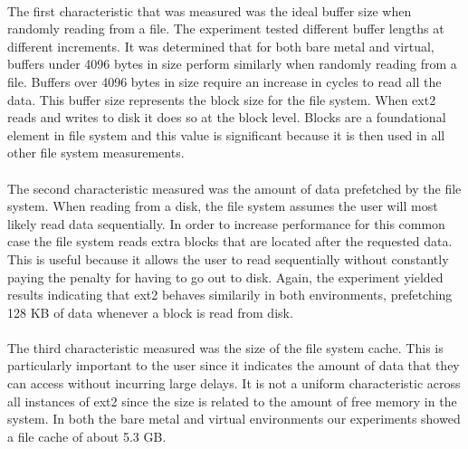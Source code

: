 \documentclass[letterpaper,twocolumn,10pt]{article}
\begin{document}
\paragraph {}
The first characteristic that was measured was the ideal buffer size when randomly reading from a file. 
The experiment tested different buffer lengths at different increments. 
It was determined that for both bare metal and virtual, buffers under 4096 bytes in size perform similarly when randomly reading from a file. 
Buffers over 4096 bytes in size require an increase in cycles to read all the data. 
This buffer size represents the block size for the file system. 
When ext2 reads and writes to disk it does so at the block level.
Blocks are a foundational element in file system and this value is significant because it is then used in all other file system measurements.

\paragraph{}
The second characteristic measured was the amount of data prefetched by the file system. 
When reading from a disk, the file system assumes the user will most likely read data sequentially. 
In order to increase performance for this common case the file system reads extra blocks that are located after the requested data. 
This is useful because it allows the user to read sequentially without constantly paying the penalty for having to go out to disk. 
Again, the experiment yielded results indicating that ext2 behaves similarily in both environments, prefetching 128 KB of data whenever a block is read from disk.

\paragraph{}
The third characteristic measured was the size of the file system cache. 
This is particularly important to the user since it indicates the amount of data that they can access without incurring large delays. 
It is not a uniform characteristic across all instances of ext2 since the size is related to the amount of free memory in the system. 
In both the bare metal and virtual environments our experiments showed a file cache of about 5.3 GB.
\end{document}
